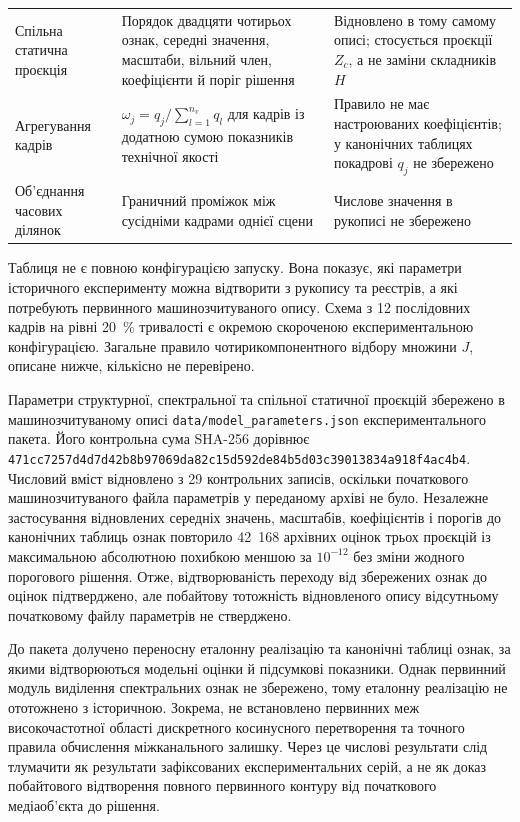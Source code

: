 \begin{longtable}{@{}p{}p{}p{}@{}}
Спільна статична проєкція & Порядок двадцяти чотирьох ознак, середні значення, масштаби, вільний член, коефіцієнти й поріг рішення & Відновлено в тому самому описі; стосується проєкції $Z_c$, а не заміни складників $H$ \\
Агрегування кадрів & $\omega_j=q_j/\sum_{l=1}^{n_v}q_l$ для кадрів із додатною сумою показників технічної якості & Правило не має настроюваних коефіцієнтів; у канонічних таблицях покадрові $q_j$ не збережено \\
Об’єднання часових ділянок & Граничний проміжок між сусідніми кадрами однієї сцени & Числове значення в рукописі не збережено \\
\end{longtable}

Таблиця не є повною конфігурацією запуску. Вона показує, які параметри історичного експерименту можна відтворити з рукопису та реєстрів, а які потребують первинного машинозчитуваного опису. Схема з 12 послідовних кадрів на рівні 20~\% тривалості є окремою скороченою експериментальною конфігурацією. Загальне правило чотирикомпонентного відбору множини $J$, описане нижче, кількісно не перевірено.

Параметри структурної, спектральної та спільної статичної проєкцій збережено в машинозчитуваному описі \nolinkurl{data/model_parameters.json} експериментального пакета. Його контрольна сума SHA-256 дорівнює \nolinkurl{471cc7257d4d7d42b8b97069da82c15d592de84b5d03c39013834a918f4ac4b4}. Числовий вміст відновлено з 29 контрольних записів, оскільки початкового машинозчитуваного файла параметрів у переданому архіві не було. Незалежне застосування відновлених середніх значень, масштабів, коефіцієнтів і порогів до канонічних таблиць ознак повторило 42~168 архівних оцінок трьох проєкцій із максимальною абсолютною похибкою меншою за $10^{-12}$ без зміни жодного порогового рішення. Отже, відтворюваність переходу від збережених ознак до оцінок підтверджено, але побайтову тотожність відновленого опису відсутньому початковому файлу параметрів не стверджено.

До пакета долучено переносну еталонну реалізацію та канонічні таблиці ознак, за якими відтворюються модельні оцінки й підсумкові показники. Однак первинний модуль виділення спектральних ознак не збережено, тому еталонну реалізацію не ототожнено з історичною. Зокрема, не встановлено первинних меж високочастотної області дискретного косинусного перетворення та точного правила обчислення міжканального залишку. Через це числові результати слід тлумачити як результати зафіксованих експериментальних серій, а не як доказ побайтового відтворення повного первинного контуру від початкового медіаоб’єкта до рішення.

